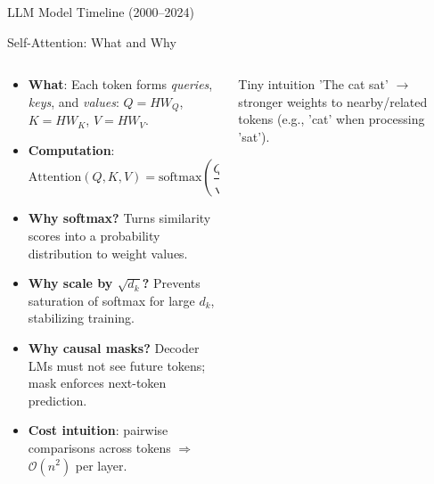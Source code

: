 \documentclass[aspectratio=169]{beamer}
\begin{document}
\begin{frame}{LLM Model Timeline (2000--2024)}
\end{frame}

\begin{frame}{Self-Attention: What and Why}
  \begin{columns}[T,onlytextwidth]
    \begin{column}{0.56\linewidth}
      \begin{itemize}
        \item \textbf{What}: Each token forms \emph{queries}, \emph{keys}, and \emph{values}: $Q = HW_Q$, $K = HW_K$, $V = HW_V$.
        \item \textbf{Computation}: 
          \[ \text{Attention}(Q,K,V) = \text{softmax}\left(\frac{QK^T}{\sqrt{d_k}}\right)V. \]
        \item \textbf{Why softmax?} Turns similarity scores into a probability distribution to weight values.
        \item \textbf{Why scale by $\sqrt{d_k}$?} Prevents saturation of softmax for large $d_k$, stabilizing training.
        \item \textbf{Why causal masks?} Decoder LMs must not see future tokens; mask enforces next-token prediction.
        \item \textbf{Cost intuition}: pairwise comparisons across tokens $\Rightarrow$ $\mathcal{O}(n^2)$ per layer.
      \end{itemize}
    \end{column}
    \begin{column}{0.4\linewidth}
      \begin{exampleblock}{Tiny intuition}
        'The cat sat' $\to$ stronger weights to nearby/related tokens (e.g., 'cat' when processing 'sat').
      \end{exampleblock}
    \end{column}
  \end{columns}
\end{frame}
\end{document}
